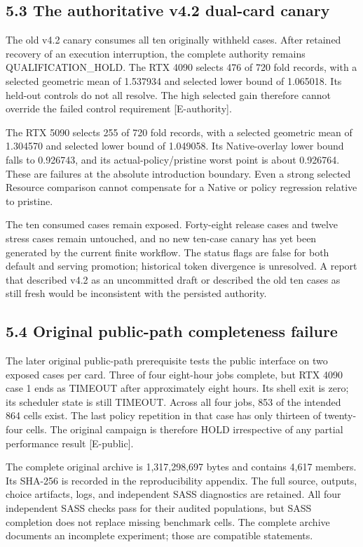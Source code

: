 \documentclass[11pt,a4paper]{article}
\begin{document}
\subsection*{5.3 The authoritative v4.2 dual-card canary}

The old v4.2 canary consumes all ten originally withheld cases. After retained recovery of an execution interruption, the complete authority remains QUALIFICATION\_HOLD. The RTX 4090 selects 476 of 720 fold records, with a selected geometric mean of 1.537934 and selected lower bound of 1.065018. Its held-out controls do not all resolve. The high selected gain therefore cannot override the failed control requirement [E-authority].


The RTX 5090 selects 255 of 720 fold records, with a selected geometric mean of 1.304570 and selected lower bound of 1.049058. Its Native-overlay lower bound falls to 0.926743, and its actual-policy/\allowbreak{}pristine worst point is about 0.926764. These are failures at the absolute introduction boundary. Even a strong selected Resource comparison cannot compensate for a Native or policy regression relative to pristine.


The ten consumed cases remain exposed. Forty-eight release cases and twelve stress cases remain untouched, and no new ten-case canary has yet been generated by the current finite workflow. The status flags are false for both default and serving promotion; historical token divergence is unresolved. A report that described v4.2 as an uncommitted draft or described the old ten cases as still fresh would be inconsistent with the persisted authority.


\subsection*{5.4 Original public-path completeness failure}

The later original public-path prerequisite tests the public interface on two exposed cases per card. Three of four eight-hour jobs complete, but RTX 4090 case 1 ends as TIMEOUT after approximately eight hours. Its shell exit is zero; its scheduler state is still TIMEOUT. Across all four jobs, 853 of the intended 864 cells exist. The last policy repetition in that case has only thirteen of twenty-four cells. The original campaign is therefore HOLD irrespective of any partial performance result [E-public].


The complete original archive is 1,317,298,697 bytes and contains 4,617 members. Its SHA-256 is recorded in the reproducibility appendix. The full source, outputs, choice artifacts, logs, and independent SASS diagnostics are retained. All four independent SASS checks pass for their audited populations, but SASS completion does not replace missing benchmark cells. The complete archive documents an incomplete experiment; those are compatible statements.
\end{document}
